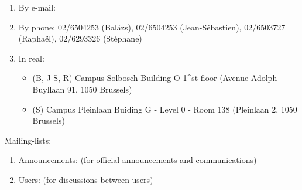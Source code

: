 \begin{enumerate}
\item  By e-mail:  \hpcinfo
\item  By phone:  02/6504253 (Bal\'azs), 02/6504253 (Jean-S\'ebastien), 02/6503727 (Rapha\"el), 02/6293326 (St\'ephane)
\item  In real:
\begin{itemize}
\item (B, J-S, R) Campus Solbosch Building O 1^{st} floor (Avenue Adolph Buyllaan 91, 1050 Brussels)
\item (S) Campus Pleinlaan Buiding G - Level 0 - Room 138 (Pleinlaan 2, 1050 Brussels)
\end{itemize}
\end{enumerate}

Mailing-lists:

\begin{enumerate}
\item  Announcements: \hpcannounceml (for official announcements and communications)
\item  Users: \hpcusersml (for discussions between users)
\end{enumerate}

